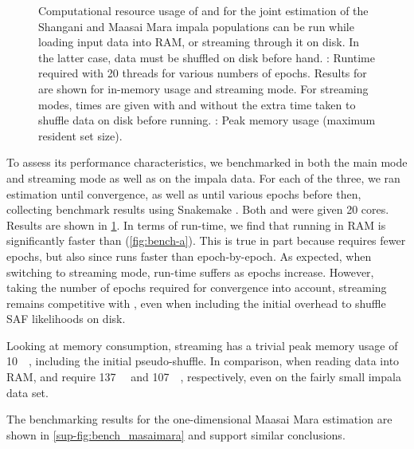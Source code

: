 \begin{figure}
    {
        \label{fig:bench-a}
        \label{fig:bench-b}
    }
    \begin{center}
    \end{center}
    \caption{
        Computational resource usage of \winsfs and \realsfs for the joint estimation of the Shangani and Maasai Mara impala populations
        \winsfs can be run while loading input data into RAM, or streaming through it on disk.
        In the latter case, data must be shuffled on disk before hand.
        :
            Runtime required with \num{20} threads for various numbers of epochs.
            Results for \winsfs are shown for in-memory usage and streaming mode.
            For streaming modes, times are given with and without the extra time taken to shuffle data on disk before running.
        :
            Peak memory usage (maximum resident set size).
    }
    \label{fig:bench}
\end{figure}

To assess its performance characteristics, we benchmarked \winsfs in both the main mode and streaming mode as well as \realsfs on the impala data.
For each of the three, we ran estimation until convergence, as well as until various epochs before then, collecting benchmark results using Snakemake \cite{Koster2012}.
Both \realsfs and \winsfs were given \num{20} cores.
Results are shown in \cref{fig:bench}.
In terms of run-time, we find that running \winsfs in RAM is significantly faster than \realsfs (\cref{fig:bench-a}).
This is true in part because \winsfs requires fewer epochs, but also since \winsfs runs faster than \realsfs epoch-by-epoch.
As expected, when switching \winsfs to streaming mode, run-time suffers as epochs increase.
However, taking the number of epochs required for convergence into account, streaming \winsfs remains competitive with \realsfs, even when including the initial overhead to shuffle SAF likelihoods on disk.

Looking at memory consumption, streaming \winsfs has a trivial peak memory usage of \SI{10}{\mega\byte}, including the initial pseudo-shuffle.
In comparison, when reading data into RAM, \realsfs  and \winsfs require \SI{137}{\giga\byte} and \SI{107}{\giga\byte}, respectively, even on the fairly small impala data set.

The benchmarking results for the one-dimensional Maasai Mara estimation are shown in \cref{sup-fig:bench_masaimara} and support similar conclusions.
